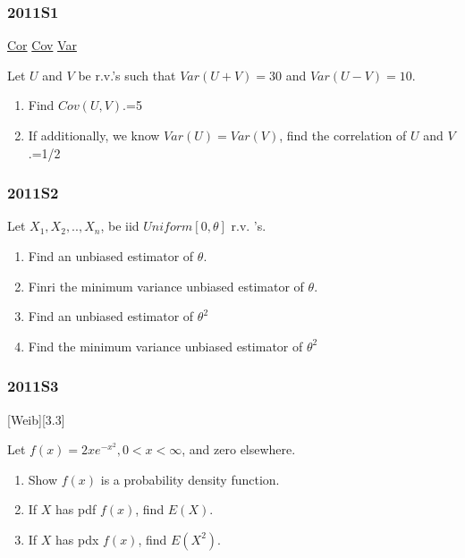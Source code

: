 \documentclass[10pt,twocolumn,portrait]{article}
\begin{document}
\hypertarget{s1-2}{%
\subsubsection{2011S1}\label{s1-2}}

\protect\hyperlink{Cor}{Cor} \protect\hyperlink{Cov}{Cov} \url{Var}

Let \(U\) and \(V\) be r.v.'s such that \(Var(U+V)=30\) and
\(Var(U-V)=10\).

\begin{enumerate}
\def\labelenumi{(\alph{enumi})}
\item
  Find \(Cov(U,V)\).=5
\item
  If additionally, we know \(Var(U)=Var(V)\), find the correlation of
  \(U\) and \(V\).=1/2
\end{enumerate}

\hypertarget{s2-2}{%
\subsubsection{2011S2}\label{s2-2}}

Let \(X_1,X_2,..,X_{n}\), be iid \(Uniform[0,\theta]\) r.v. 's.

\begin{enumerate}
\def\labelenumi{(\alph{enumi})}
\item
  Find an unbiased estimator of \(\theta\).
\item
  Finri the minimum variance unbiased estimator of \(\theta\).
\item
  Find an unbiased estimator of \(\theta^2\)
\item
  Find the minimum variance unbiased estimator of \(\theta^2\)
\end{enumerate}

\hypertarget{s3-2}{%
\subsubsection{2011S3}\label{s3-2}}

{[}Weib{]}{[}3.3{]}

Let \(f(x)=2xe^{-x^2},0<x<\infty\), and zero elsewhere.

\begin{enumerate}
\def\labelenumi{(\alph{enumi})}
\item
  Show \(f(x)\) is a probability density function.
\item
  If \(X\) has pdf \(f(x)\), find \(E(X)\).
\item
  If \(X\) has pdx \(f(x)\), find \(E(X^2)\).
\end{enumerate}
\end{document}
